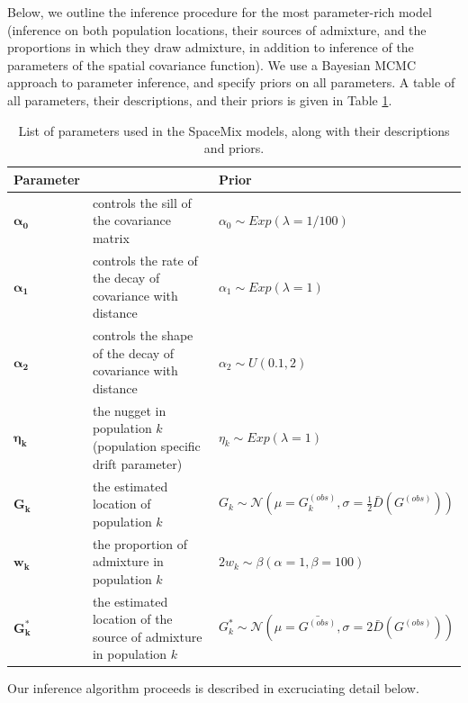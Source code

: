 \documentclass[12pt]{article}
\newcommand{\identifyadmixsource}[1]{{#1^{*}}}
\begin{document}
Below, we outline the inference procedure for the most parameter-rich model (inference on both population locations, their sources of admixture, and the proportions in which they draw admixture, in addition to inference of the parameters of the spatial covariance function).
We use a Bayesian MCMC approach to parameter inference, and specify priors on all parameters.  A table of all parameters, their descriptions, and their priors is given in Table \ref{tab:param_prior_tab}.

\begin{centering}
\begin{table}
\begin{tabular}{| >{\centering\arraybackslash}m{2.0cm} | m{5.2cm} | >{\centering\arraybackslash}m{6.8cm} |}
	\hline
	\textbf{Parameter} & \centering{\textbf{Description}} & \textbf{Prior}\\ \hline
	$\boldsymbol{\alpha_0}$ & 
		controls the sill of the covariance matrix & 
		$\alpha_0 \sim Exp(\lambda = 1/100)$\\ \hline
	$\boldsymbol{\alpha_1}$ & 
		controls the rate of the decay of covariance with distance & 
		$\alpha_1 \sim Exp(\lambda = 1)$\\ \hline
	$\boldsymbol{\alpha_2}$ & 
		controls the shape of the decay of covariance with distance & 
		$\alpha_2 \sim U(0.1,2)$\\ \hline
	$\boldsymbol{\eta_k}$ & 
		the nugget in population $k$ (population specific drift parameter)  & 
		$\eta_k \sim Exp(\lambda = 1)$\\ \hline
	$\boldsymbol{G_k}$ & 
		the estimated location of population $k$ &
		 $G_k \sim \mathcal{N}(\mu = G^{(obs)}_k,\sigma = \frac{1}{2}\bar{D}(G^{(obs)}))$ \\ \hline
	$\boldsymbol{w_k}$ &
		the proportion of admixture in population $k$ &
		$2 w_k \sim \beta(\alpha = 1,\beta = 100)$  \\ \hline
	$\boldsymbol{\identifyadmixsource{G_k}}$ &
		the estimated location of the source of admixture in population $k$ &
		$\identifyadmixsource{G_k} \sim \mathcal{N}(\mu = \bar{G^{(obs)}},\sigma = 2 \bar{D}(G^{(obs)}))$ \\
	\hline
\end{tabular}
\caption{List of parameters used in the SpaceMix models, along with their descriptions and priors.}\label{tab:param_prior_tab}
\end{table}
\end{centering}

Our inference algorithm proceeds is described in excruciating detail below.
\end{document}
